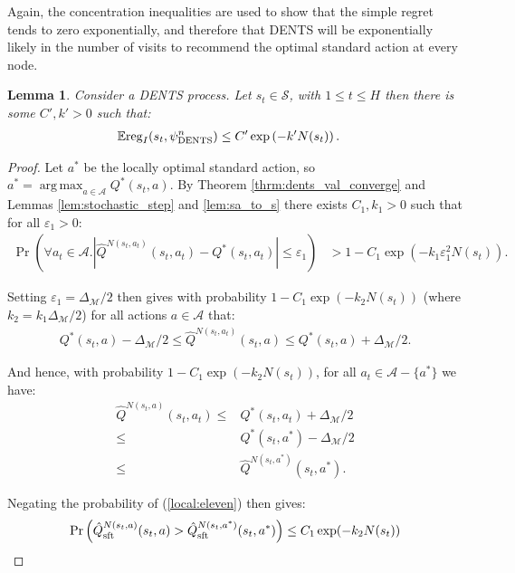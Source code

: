 \documentclass{article}
\newcommand{\bb}[1]{\mathbb{#1}}
\newcommand{\cl}[1]{\mathcal{#1}}
\newcommand{\Qst}[3]{\hat{Q}^{#3}_{\textnormal{sft}}(#1,#2)}
\newcommand{\Qt}[3]{\hat{Q}^{#3}(#1,#2)}
\newcommand{\reg}{\textnormal{reg}}
\DeclareMathOperator*{\argmax}{arg\,max}
\theoremstyle{plain}
\newtheorem{lemma}[theorem]{Lemma}
\begin{document}
\begin{appendices}
    
        Again, the concentration inequalities are used to show that the simple regret tends to zero exponentially, and therefore that DENTS will be exponentially likely in the number of visits to recommend the optimal standard action at every node.
        
        \begin{lemma} \label{lem:dents_imm_simple_regret}
            Consider a DENTS process. Let $s_t\in\cl{S}$, with $1\leq t \leq H$ then there is some $C',k'>0$ such that:
            \begin{align}
                \bb{E} \reg_I(s_{t},\psi^n_{\textnormal{DENTS}}) &\leq C'\exp\left( -k' N(s_{t}) \right).
            \end{align}
        \end{lemma}
        \begin{proof}
            Let $a^*$ be the locally optimal standard action, so $a^*=\argmax_{a\in\cl{A}} Q^*(s_t,a)$. By Theorem \ref{thrm:dents_val_converge} and Lemmas \ref{lem:stochastic_step} and \ref{lem:sa_to_s} there exists $C_1,k_1>0$ such that for all $\varepsilon_1>0$:
            \begin{align}
                \Pr\left(\forall a_t\in\cl{A}. \left|\Qt{s_t}{a_t}{N(s_t,a_t)}-Q^*(s_t,a_t)\right|\leq \varepsilon_1\right) &> 1-C_1 \exp(-k_1 \varepsilon_1^2 N(s_t)).
            \end{align}
            
            Setting $\varepsilon_1=\Delta_{\cl{M}}/2$ then gives with probability $1-C_1 \exp(-k_2N(s_t))$ (where $k_2=k_1\Delta_{\cl{M}}/2$) for all actions $a\in\cl{A}$ that:
            \begin{align}
                Q^*(s_t,a) - \Delta_{\cl{M}}/2 \leq \Qt{s_t}{a}{N(s_t,a_t)} \leq Q^*(s_t,a) + \Delta_{\cl{M}}/2.
            \end{align}
            
            And hence, with probability $1-C_1 \exp(-k_2N(s_t))$, for all $a_t\in\cl{A}-\{a^*\}$ we have:
            \begin{align}
                \Qt{s_t}{a_t}{N(s_t,a)}
                    \leq& Q^*(s_t,a_t) + \Delta_{\cl{M}}/2 \\
                    \leq& Q^*(s_t,a^*) - \Delta_{\cl{M}}/2 \\
                    \leq& \Qt{s_t}{a^*}{N(s_t,a^*)}. \label{local:eleven}
            \end{align}
            
            Negating the probability of (\ref{local:eleven}) then gives:
            \begin{align}
                \Pr\left(\Qst{s_t}{a}{N(s_t,a)} > \Qst{s_t}{a^*}{N(s_t,a^*)}\right) \leq C_1 \exp(-k_2N(s_t))
            \end{align}
            

\end{proof}
\end{appendices}
\end{document}
